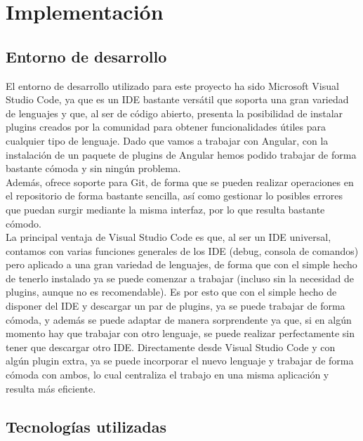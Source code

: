 \chapter{Implementaci\'on}\label{implementacion}

\section{Entorno de desarrollo}

El entorno de desarrollo utilizado para este proyecto ha sido Microsoft Visual Studio Code, ya que es un IDE bastante versátil que soporta una gran variedad de lenguajes y que, al ser de código abierto, presenta la posibilidad de instalar plugins creados por la comunidad para obtener funcionalidades útiles para cualquier tipo de lenguaje. Dado que vamos a trabajar con Angular, con la instalación de un paquete de plugins de Angular hemos podido trabajar de forma bastante cómoda y sin ningún problema.\\

Además, ofrece soporte para Git, de forma que se pueden realizar operaciones en el repositorio de forma bastante sencilla, así como gestionar lo posibles errores que puedan surgir mediante la misma interfaz, por lo que resulta bastante cómodo.\\

La principal ventaja de Visual Studio Code es que, al ser un IDE universal, contamos con varias funciones generales de los IDE (debug, consola de comandos) pero aplicado a una gran variedad de lenguajes, de forma que con el simple hecho de tenerlo instalado ya se puede comenzar a trabajar (incluso sin la necesidad de plugins, aunque no es recomendable). Es por esto que con el simple hecho de disponer del IDE y descargar un par de plugins, ya se puede trabajar de forma cómoda, y además se puede adaptar de manera sorprendente ya que, si en algún momento hay que trabajar con otro lenguaje, se puede realizar perfectamente sin tener que descargar otro IDE. Directamente desde Visual Studio Code y con algún plugin extra, ya se puede incorporar el nuevo lenguaje y trabajar de forma cómoda con ambos, lo cual centraliza el trabajo en una misma aplicación y resulta más eficiente.\\

\section{Tecnolog\'ias utilizadas}

